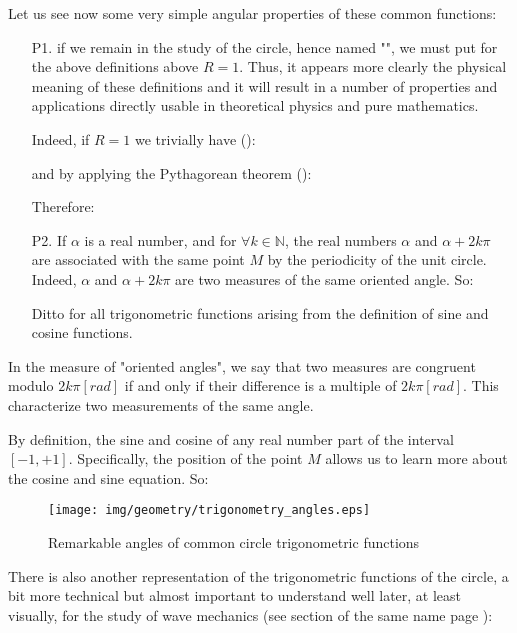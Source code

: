 	Let us see now some very simple angular properties of these common functions:
	\begin{enumerate}
		\item[P1.] if we remain in the study of the circle, hence named "\label{trigonometric circle}", we must put for the above definitions above $R=1$. Thus, it appears more clearly the physical meaning of these definitions and it will result in a number of properties and applications directly usable in theoretical physics and pure mathematics.
		
		Indeed, if $R=1$ we trivially have ():
		
		and by applying the Pythagorean theorem ():
		
		Therefore:
		
		
		\item[P2.] If $\alpha$ is a real number, and for $\forall k \in \mathbb{N}$, the real numbers $\alpha$ and $\alpha + 2k\pi$ are associated with the same point $M$ by the periodicity of the unit circle. Indeed, $\alpha$ and $\alpha + 2k\pi$ are two measures of the same oriented angle. So:
		
		Ditto for all trigonometric functions arising from the definition of sine and cosine functions.
	\end{enumerate}

	\begin{tcolorbox}[title=Remark,colframe=black,arc=10pt]
	In the measure of "oriented angles", we say that two measures are congruent modulo $2k\pi [rad]$ if and only if their difference is a multiple of $2k\pi [rad]$. This characterize two measurements of the same angle.
	\end{tcolorbox}
	
	By definition, the sine and cosine of any real number part of the 
 interval $[-1,+1]$. Specifically, the position of the point $M$ allows us to learn more about the cosine and sine equation. So:
 
\begin{figure}[H]
\centering
\texttt{[image: img/geometry/trigonometry\_angles.eps]}
\caption{Remarkable angles of common circle trigonometric functions}
\end{figure}

There is also another representation of the trigonometric functions of the circle, a bit more technical but almost important to understand well later, at least visually, for the study of wave mechanics (see section of the same name page \pageref{wave mechanics}):

